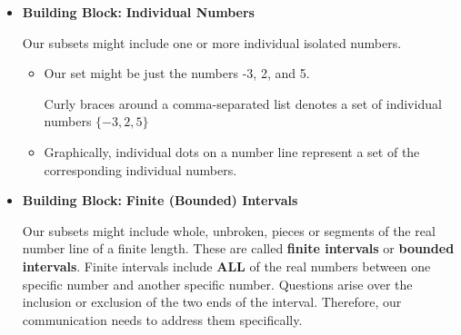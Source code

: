 \documentclass{ximera}
\begin{document}
\begin{itemize}
\item \textbf{Building Block:} \textbf{\textcolor{purple!85!blue}{Individual Numbers}}  

Our subsets might include one or more individual isolated numbers.  
	\begin{itemize}
	\item Our set might be just the numbers -3, 2, and 5.

	Curly braces around a comma-separated list denotes a set of individual numbers $\{ -3, 2, 5 \}$

	\item Graphically, individual dots on a number line represent a set of the corresponding individual numbers.

	\begin{image}
	\end{image}



	\end{itemize}



\item  \textbf{Building Block:} \textbf{\textcolor{purple!85!blue}{Finite (Bounded) Intervals}}   

Our subsets might include whole, unbroken, pieces or segments of the real number line of a finite length.  These are called \textbf{finite intervals} or \textbf{bounded intervals}.   Finite intervals include \textbf{\textcolor{red!90!darkgray}{ALL}} of the real numbers between one specific number and another specific number.  Questions arise over the inclusion or exclusion of the two ends of the interval. Therefore, our communication needs to address them specifically.


\end{itemize}
\end{document}
